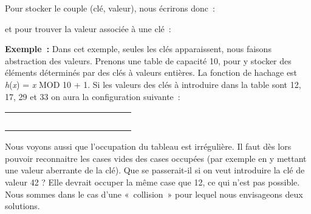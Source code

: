 
	Pour stocker le couple (clé, valeur), nous écrirons donc~:

	
	et pour trouver la valeur associée à une clé~:
	

	\textbf{Exemple~:} 
	Dans cet exemple, seules les clés apparaissent, 
	nous faisons abstraction des valeurs. Prenons une
	table de capacité 10, pour y stocker des éléments déterminés 
	par des clés à valeurs entières. La fonction de hachage
	est \textit{h}(\textit{x}) = \textit{x} MOD 10 + 1. 
	Si les valeurs des clés à introduire dans la table sont 12, 17, 29
	et 33 on aura la configuration suivante~:

	\begin{center}
		\tablefirsthead{}
		\tablehead{}
		\tabletail{}
		\tablelasttail{}
		\begin{supertabular}{m{0.999cm}m{0.999cm}m{0.999cm}m{0.999cm}m{0.999cm}m{0.999cm}m{0.999cm}m{0.999cm}m{0.999cm}m{0.999cm}}
		 &
		 &
		 &
		 &
		 &
		 &
		 &
		 &
		 &
		\centering{}\\\hline
		 &
		 &
		 &
		 &
		 &
		 &
		 &
		 &
		 &
		\\\hline
		\end{supertabular}
	\end{center}
	
	Nous voyons aussi que l'occupation du tableau est irrégulière. 
	Il faut dès lors pouvoir reconnaitre les cases vides des
	cases occupées (par exemple en y mettant une valeur aberrante de la clé). 
	Que se passerait-il si on veut introduire la clé de valeur 42 ? 
	Elle devrait occuper la même case que 12, ce qui n'est pas possible. Nous sommes
	dans le cas d'une «~collision~» pour lequel nous envisageons deux solutions.



